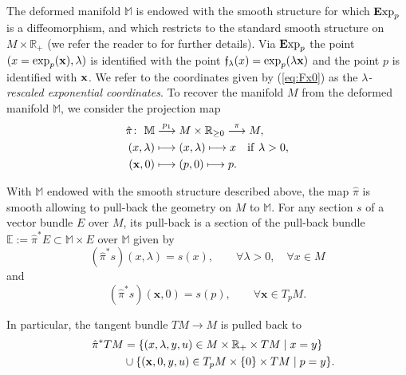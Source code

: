 \documentclass[pdftex]{sigma}
\numberwithin{equation}{section}
\theoremstyle{definition}
\newcommand{\R}{\mathbb R}
\newcommand{\M}{\mathbb M}
\newcommand{\E}{\mathbb E}
\newcommand{\Exp}{{\mathbf E}{\rm xp}}
\def \bui#1#2{\mathrel{\mathop{\kern 0pt#1}\limits^{#2}}}
\begin{document}
The deformed manifold $\M$ is endowed with the smooth structure for which $\Exp_{p}$ is a diffeomorphism, and which restricts to the standard smooth structure on {$M\times \R_+$} (we refer the reader to \cite[above Lemma~4.3]{H} for further details). Via $\Exp_p$ the point $(x=\exp_p({\bf x}), \lambda)$ is identified with the point $\mathfrak{f}_\lambda(x)={\rm exp}_p(\lambda {\bf x})$ and the point $p$ is identified with ${\bf x}$. We refer to the coordinates given by (\ref{eq:Fx0}) as the {\it $\lambda$-rescaled exponential coordinates}. To recover the manifold $M$ from the deformed manifold $\M$, we consider the projection map
\begin{align*}
\hat \pi\colon \ \M & \bui{\longrightarrow}{p_1} M\times\R_{\geq 0} \bui{\longrightarrow}{\pi} M,\\
(x, \lambda)& \longmapsto (x, \lambda) \longmapsto x \quad {\rm if} \ \lambda>0, \\
({\mathbf x},0) & \longmapsto (p,0) \longmapsto p.
\end{align*}

With $\M$ endowed with the smooth structure described above, the map $\hat\pi$ is smooth allowing to pull-back the geometry on $M$ to $\M$. For any section $s$ of a vector bundle $E$ over $M$, its pull-back is a section of the pull-back bundle $\E:=\hat \pi^* E\subset \M\times E$ over $\M$ given by
\[
(\hat\pi^* s)(x,\lambda)=s(x),\qquad \forall \lambda>0 ,\quad \forall x\in M
\]
and
\[
(\hat\pi^* s)({\mathbf x},0)=s(p),\qquad \forall {\mathbf x}\in T_pM.
\]

In particular, the tangent bundle $TM\to M$ is pulled back to
\begin{gather*}
\hat \pi^* TM=\{(x,\lambda,y,u)\in M\times\R_+\times TM\mid x=y\}\\
\hphantom{\hat \pi^* TM=}{}
\cup \{({\bf x},0,y,u)\in T_pM\times \{0\}\times TM\mid p=y\}.
\end{gather*}
\end{document}
